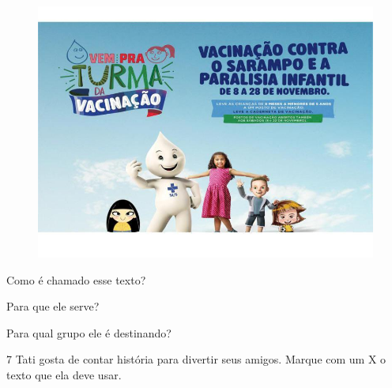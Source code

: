 \begin{figure}[htpb!]
\includegraphics[width=\textwidth]{media/image107.jpeg}
\end{figure}


\begin{escolha}
\item Como é chamado esse texto?


\item Para que ele serve?


\item Para qual grupo ele é destinando?

\end{escolha}

\pagebreak
\num{7} Tati gosta de contar história para divertir seus amigos.
Marque com um X o texto que ela deve usar.

